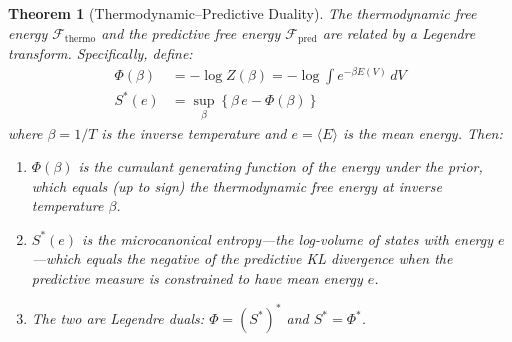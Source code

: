 \documentclass[12pt,a4paper]{article}
\newtheorem{theorem}{Theorem}[section]
\theoremstyle{definition}
\begin{document}
\begin{theorem}[Thermodynamic--Predictive Duality]\label{thm:duality}
The thermodynamic free energy $\mathcal{F}_{\text{thermo}}$ and the predictive free energy $\mathcal{F}_{\text{pred}}$ are related by a Legendre transform. Specifically, define:
\begin{align}
    \Phi(\beta) &= -\log Z(\beta) = -\log \int e^{-\beta E(V)} \, dV \label{eq:legendre_phi} \\
    S^*(e) &= \sup_{\beta} \left\{\beta \, e - \Phi(\beta)\right\} \label{eq:legendre_dual}
\end{align}
where $\beta = 1/T$ is the inverse temperature and $e = \langle E \rangle$ is the mean energy. Then:
\begin{enumerate}[label=(\roman*)]
    \item $\Phi(\beta)$ is the cumulant generating function of the energy under the prior, which equals (up to sign) the thermodynamic free energy at inverse temperature $\beta$.
    \item $S^*(e)$ is the microcanonical entropy---the log-volume of states with energy $e$---which equals the negative of the predictive KL divergence when the predictive measure is constrained to have mean energy $e$.
    \item The two are Legendre duals: $\Phi = (S^*)^*$ and $S^* = \Phi^*$.
\end{enumerate}
\end{theorem}
\end{document}
